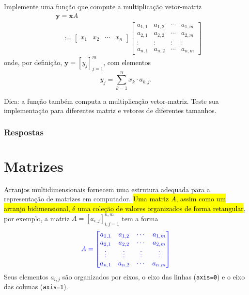 \begin{exer}
  Implemente uma função que compute a multiplicação vetor-matriz
  \begin{align}
    & \pmb{y} = \pmb{x}A \\
    & \text{}\quad := \begin{bmatrix}
              x_1 & x_2 & \cdots & x_n
            \end{bmatrix}
            \begin{bmatrix}
              a_{1,1} & a_{1,2} & \cdots & a_{1,m}\\
              a_{2,1} & a_{2,2} & \cdots & a_{2,m}\\
              \vdots & \vdots & \vdots & \vdots\\
              a_{n,1} & a_{n,2} & \cdots & a_{n,m}
            \end{bmatrix}
  \end{align}
  onde, por definição, $\pmb{y} = [y_j]_{j=1}^m$, com elementos
  \begin{equation}
    y_j = \sum_{k=1}^n x_k\cdot a_{k,j}.
  \end{equation}
\end{exer}
\begin{resp}
  Dica: a função {\PYTHONnumpyDOTdot} também computa a multiplicação vetor-matriz. Teste sua implementação para diferentes matriz e vetores de diferentes tamanhos.
\end{resp}

\ifisbook
\subsubsection{Respostas}
\shipoutAnswer
\fi


\section{Matrizes}\label{cap_arr_sec_mat}

Arranjos multidimensionais fornecem uma estrutura adequada para a representação de matrizes em computador. \hl{Uma matriz $A$, assim como um arranjo bidimensional, é uma coleção de valores organizados de forma retangular}, por exemplo, a matriz $A = [a_{i,j}]_{i,j=1}^{n,m}$ tem a forma
\begin{equation}\color{blue}A =
  \begin{bmatrix}
    a_{1,1} & a_{1,2} & \cdots & a_{1,m}\\
    a_{2,1} & a_{2,2} & \cdots & a_{2,m}\\
    \vdots & \vdots & \vdots & \vdots\\
    a_{n,1} & a_{n,2} & \cdots & a_{n,m}
  \end{bmatrix}
\end{equation}
Seus elementos $a_{i,j}$ são organizados por eixos, o eixo das linhas (\lstinline+axis=0+) e o eixo das colunas (\lstinline+axis=1+).

